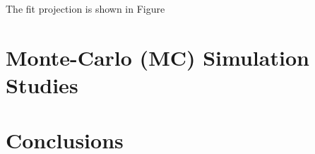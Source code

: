 \documentclass[10pt,twocolumn]{article}
\begin{document}
The fit projection is shown in Figure 

\section{Monte-Carlo (MC) Simulation Studies}

\section{Conclusions}



\end{document}
